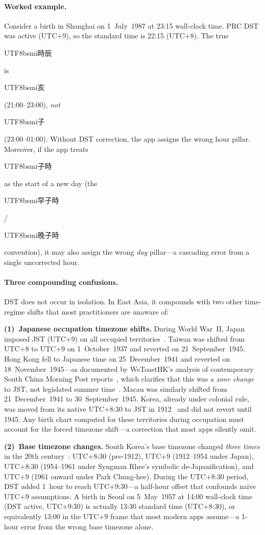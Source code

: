 \documentclass[10pt,a4paper]{article}
\newcommand{\zh}[1]{\begin{CJK}{UTF8}{bsmi}#1\end{CJK}}
\begin{document}
\paragraph{Worked example.}
Consider a birth in Shanghai on 1~July~1987 at 23:15 wall-clock time.  PRC
DST was active (UTC$+$9), so the standard time is 22:15 (UTC$+$8).  The
true \zh{時辰} is \zh{亥} (21:00--23:00), \emph{not} \zh{子}
(23:00--01:00).  Without DST correction, the app assigns the wrong hour
pillar.  Moreover, if the app treats \zh{子時} as the start of a new day
(the \zh{早子時}/\zh{晚子時} convention), it may also assign the wrong
\emph{day} pillar---a cascading error from a single uncorrected hour.

\paragraph{Three compounding confusions.}
DST does not occur in isolation.  In East Asia, it compounds with two
other time-regime shifts that most practitioners are unaware of:

\textbf{(1)~Japanese occupation timezone shifts.}
During World War~II, Japan imposed JST (UTC$+$9) on all occupied
territories~\cite{iana_tzdata_asia, china_timezone}.  Taiwan was shifted
from UTC$+$8 to UTC$+$9 on 1~October~1937 and reverted on
21~September~1945.  Hong Kong fell to Japanese time on
25~December~1941 and reverted on 18~November~1945---as documented by
WeToastHK's analysis of contemporary South China Morning Post
reports~\cite{wetoasthk_dst}, which clarifies that this was a
\emph{zone change} to JST, not legislated summer
time~\cite{hko_summertime}.  Macau was similarly shifted from
21~December~1941 to 30~September~1945.  Korea, already under colonial
rule, was moved from its native UTC$+$8:30 to JST in
1912~\cite{korea_tz_history} and did not revert until 1945.  Any birth
chart computed for these territories during occupation must account for
the forced timezone shift---a correction that most apps silently omit.

\textbf{(2)~Base timezone changes.}
South Korea's base timezone changed \emph{three times} in the 20th
century~\cite{korea_tz_history, iana_tzdata_asia}:
UTC$+$8:30 (pre-1912), UTC$+$9 (1912--1954 under Japan), UTC$+$8:30
(1954--1961 under Syngman Rhee's symbolic de-Japanification), and
UTC$+$9 (1961 onward under Park Chung-hee).  During the UTC$+$8:30
period, DST added 1~hour to reach UTC$+$9:30---a half-hour offset
that confounds naive UTC$+$9 assumptions.  A birth in Seoul on
5~May~1957 at 14:00 wall-clock time (DST active, UTC$+$9:30) is
actually 13:30 standard time (UTC$+$8:30), or equivalently 13:00 in
the UTC$+$9 frame that most modern apps assume---a 1-hour error from
the wrong base timezone alone.
\end{document}

